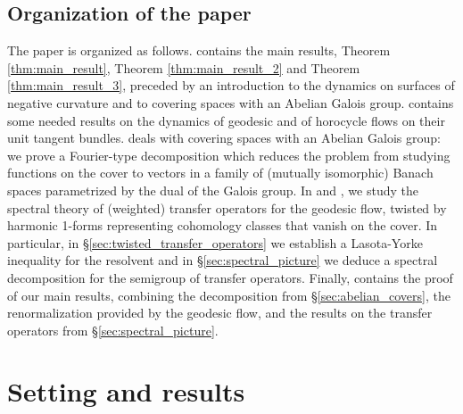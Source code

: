 \documentclass[11pt,letterpaper]{amsart}
\theoremstyle{definition}
\begin{document}
\subsection{Organization of the paper}
The paper is organized as follows.  contains the main results, Theorem \ref{thm:main_result}, Theorem \ref{thm:main_result_2} and Theorem \ref{thm:main_result_3}, preceded by an introduction to the dynamics on surfaces of negative curvature and to covering spaces with an Abelian Galois group. 
 contains some needed results on the dynamics of geodesic and of horocycle flows on their unit tangent bundles.  deals with covering spaces with an Abelian Galois group: we prove a Fourier-type decomposition which reduces the problem from studying functions on the cover to vectors in a family of (mutually isomorphic) Banach spaces parametrized by the dual of the Galois group. In  and , we study the spectral theory of (weighted) transfer operators for the geodesic flow, twisted by harmonic 1-forms representing cohomology classes that vanish on the cover. In particular, in \S\ref{sec:twisted_transfer_operators} we establish a Lasota-Yorke inequality for the resolvent and in \S\ref{sec:spectral_picture} we deduce a spectral decomposition for the semigroup of transfer operators. Finally,  contains the proof of our main results, combining the decomposition from \S\ref{sec:abelian_covers}, the renormalization provided by the geodesic flow, and the results on the transfer operators from \S\ref{sec:spectral_picture}. 


\section{Setting and results}\label{sec:result}


\end{document}
